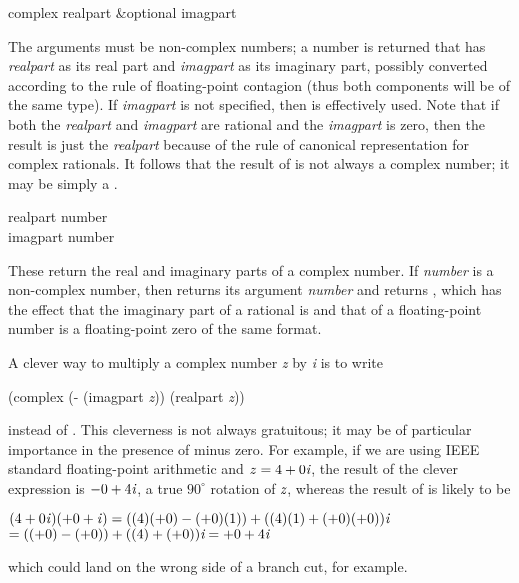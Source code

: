 \begin{defun}[Function]
complex realpart &optional imagpart

The arguments must be non-complex numbers; a number is returned
that has \emph{realpart} as its real part and \emph{imagpart} as its imaginary
part, possibly converted according to the rule of floating-point
contagion (thus both components will be of the same type).
If \emph{imagpart} is not specified,
then  is
effectively used.  Note that if both the \emph{realpart} and \emph{imagpart} are
rational and the \emph{imagpart} is zero, then the result is just the
\emph{realpart} because of the rule of canonical representation
for complex rationals.  It follows that the result of 
is not always a complex number; it may be simply a .
\end{defun}

\begin{defun}[Function]
realpart number \\
imagpart number

These return the real and imaginary parts of a complex number.  If
\emph{number} is a non-complex number, then  returns its
argument \emph{number} and 
returns , which
has the effect that the imaginary part of a rational is  and that of
a floating-point number is a floating-point zero of the same format.

\begin{newer}
A clever way to multiply a complex number \emph{z} by \emph{i} is to write
\begin{lisp}
(complex (- (imagpart \emph{z})) (realpart \emph{z}))
\end{lisp}
instead of .  This cleverness is not always
gratuitous; it may be of particular importance in the presence of minus
zero.  For example, if we are using IEEE standard floating-point arithmetic
and $z=4+0\emph{i}$, the result of the clever expression is $-0+4\emph{i}$, a true
$90^\circ$ rotation of $\emph{z}$, whereas the result of 
is likely to be
\begin{tabbing}
$ (4+0\emph{i\/})(+0+\emph{i\/}) = ((4)(+0) - (+0)(1)) + ((4)(1) + (+0)(+0))\emph{i} $ \\
\hskip2pc$ = ((+0)-(+0))+((4)+(+0))\emph{i} = +0+4\emph{i} $
\end{tabbing}
which could
land on the wrong side of a branch cut, for example.
\end{newer}
\end{defun}

